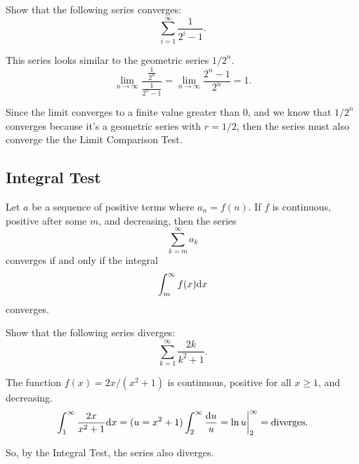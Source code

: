 \begin{example}
	Show that the following series converges:
	\begin{equation*}
		\sum_{i=1}^{\infty}{\frac{1}{2^i - 1}}.
	\end{equation*}
\end{example}
\begin{answer}
	This series looks similar to the geometric series $1/2^n$.
	\begin{equation*}
		\lim_{n\to\infty}{\frac{\frac{1}{2^n}}{\frac{1}{2^n-1}}} = \lim_{n\to\infty}{\frac{2^n - 1}{2^n}} = 1.
	\end{equation*}
	
	Since the limit converges to a finite value greater than 0, and we know that $1/2^n$ converges because it's a geometric series with $r=1/2$, then the series must also converge the the Limit Comparison Test.
\end{answer}

\subsection{Integral Test}
\begin{lemma}
	Let $a$ be a sequence of positive terms where $a_n = f(n)$.
	If $f$ is continuous, positive after some $m$, and decreasing, then the series
	\begin{equation*}
		\sum_{k=m}^{\infty}{a_k}
	\end{equation*}
	converges if and only if the integral
	\begin{equation*}
		\int_{m}^{\infty}{f(x)\mathrm{d} x}
	\end{equation*}
	converges.
\end{lemma}

\begin{example}
	Show that the following series diverges:
	\begin{equation*}
		\sum_{k=1}^{\infty}{\frac{2k}{k^2+1}}.
	\end{equation*}
\end{example}
\begin{answer}
	The function $f(x)=2x/(x^2+1)$ is continuous, positive for all $x \geq 1$, and decreasing.
	\begin{equation*}
		\int_{1}^{\infty}{\frac{2x}{x^2+1}\mathrm{d} x} = (u = x^2+1) \int_{2}^{\infty}{\frac{\mathrm{d} u}{u}} = \ln{u}\biggr\rvert_{2}^{\infty} = \text{diverges}.
	\end{equation*}
	
	So, by the Integral Test, the series also diverges.
\end{answer}

